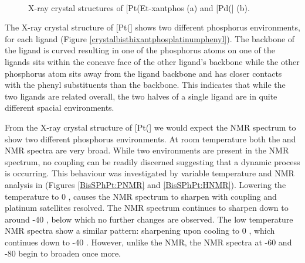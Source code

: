 \begin{figure}[htbp]
\begin{subfigure}[b]{0.45\textwidth}
	\caption{}
	\label{PdPhxantphos2}
\end{subfigure}
\\
\caption[X-ray crystal structures of [Pt(Et-xantphos\ce{)2}{]} and [Pd(\Phxantphos\ce{)2}{]}]{X-ray crystal structures of [Pt(Et-xantphos\ce{)2}{]} (a) and [Pd(\Phxantphos{}] (b).\cite{Grushin2006, Miedaner2004}}
\label{Mdiphosphine2}
\end{figure}

The X-ray crystal structure of [Pt(\Phthixantphos{}] shows two different phosphorus environments, for each \Phthixantphos{} ligand (Figure \ref{crystalbisthixantphosplatinumphenyl}).  The backbone of the \Phthixantphos{} ligand is curved resulting in one of the phosphorus atoms on one of the ligands sits within the concave face of the other ligand's backbone while the other phosphorus atom sits away from the ligand backbone and has closer contacts with the phenyl substituents than the backbone.  This indicates that while the two ligands are related overall, the two halves of a single ligand are in quite different spacial environments.  

From the X-ray crystal structure of [Pt(\Phthixantphos{}] we would expect the \phosphorus{} NMR spectrum to show two different phosphorus environments.  At room temperature both the \proton{} and \phosphorus{} NMR spectra are very broad.  While two environments are present in the \phosphorus{} NMR spectrum, no coupling can be readily discerned suggesting that a dynamic process is occurring. This behaviour was investigated by variable temperature \proton{} and \phosphorus{} NMR analysis in  (Figures \ref{BisSPhPt:PNMR} and \ref{BisSPhPt:HNMR}).  Lowering the temperature to 0 \degC, causes the \phosphorus{} NMR spectrum to sharpen with coupling and platinum satellites resolved.  The \phosphorus{} NMR spectrum continues to sharpen down to around -40 \degC, below which no further changes are observed.  The low temperature \proton{} NMR spectra show a similar pattern: sharpening upon cooling to 0 \degC, which continues down to -40 \degC.  However, unlike the \phosphorus{} NMR, the \proton{} NMR spectra at -60 and -80 \degC{} begin to broaden once more.

